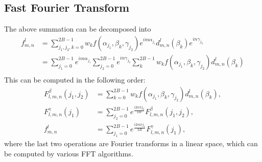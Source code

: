 \documentclass[onecolumn,11pt]{ieeetran}
\begin{document}
\subsection{Fast Fourier Transform}
The above summation can be decomposed into
\begin{align*}
f^l_{m,n}&=\sum_{j_1,j_2,k=0}^{2B-1} w_k f(\alpha_{j_1},\beta_k,\gamma_{j_2})
e^{im\alpha_{j_1}} d^l_{m,n}(\beta_k) e^{in\gamma_{j_2}}\\
&=\sum_{j_1=0}^{2B-1} 
e^{im\alpha_{j_1}}\sum_{j_2=0}^{2B-1} e^{in\gamma_{j_2}} \sum_{k}^{2B-1}w_k f(\alpha_{j_1},\beta_k,\gamma_{j_2})d^l_{m,n}(\beta_k) \\
\end{align*}
This can be computed in the following order:
\begin{align*}
F^{\beta}_{l,m,n}(j_1,j_2)&=\sum_{k=0}^{2B-1}w_k f(\alpha_{j_1},\beta_k,\gamma_{j_2})d^l_{m,n}(\beta_k),\\
F^{\gamma}_{l,m,n}(j_1)&=\sum_{j_2=0}^{2B-1}e^{\frac{i 2 n \pi j_2}{2B}}F^{\beta}_{l,m,n}(j_1,j_2),\\
f^l_{m,n} & = \sum_{j_1=0}^{2B-1} e^{\frac{i 2 m\pi j_1}{2B}}F^{\gamma}_{l,m,n}(j_1),
\end{align*}
where the last two operations are Fourier transforms in a linear space, which can be computed by various FFT algorithms. 

%
\end{document}
